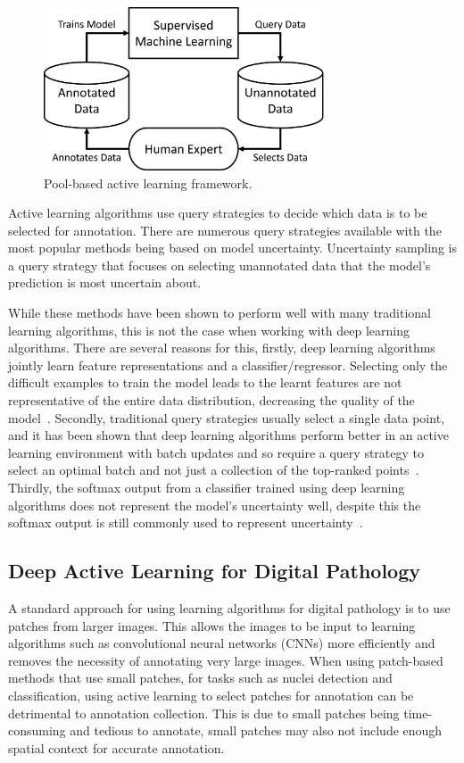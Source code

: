 \begin{figure}[h]
	\centering
	\includegraphics[width=0.75\textwidth]{images/active_learning.png}
	\caption{Pool-based active learning framework.}
	\label{fig:pool_based_active_learning}
\end{figure}

Active learning algorithms use query strategies to decide which data is to be selected for annotation. There are numerous query strategies available with the most popular methods being based on model uncertainty. Uncertainty sampling is a query strategy that focuses on selecting unannotated data that the model’s prediction is most uncertain about.

While these methods have been shown to perform well with many traditional learning algorithms, this is not the case when working with deep learning algorithms. There are several reasons for this, firstly, deep learning algorithms jointly learn feature representations and a classifier/regressor. Selecting only the difficult examples to train the model leads to the learnt features are not representative of the entire data distribution, decreasing the quality of the model~\citep{wang2016cost}. Secondly, traditional query strategies usually select a single data point, and it has been shown that deep learning algorithms perform better in an active learning environment with batch updates and so require a query strategy to select an optimal batch and not just a collection of the top-ranked points~\citep{sener2017active}. Thirdly, the softmax output from a classifier trained using deep learning algorithms does not represent the model’s uncertainty well, despite this the softmax output is still commonly used to represent uncertainty~\citep{gal2016dropout}.

\subsection{Deep Active Learning for Digital Pathology}
A standard approach for using learning algorithms for digital pathology is to use patches from larger images. This allows the images to be input to learning algorithms such as convolutional neural networks (CNNs) more efficiently and removes the necessity of annotating very large images. When using patch-based methods that use small patches, for tasks such as nuclei detection and classification, using active learning to select patches for annotation can be detrimental to annotation collection. This is due to small patches being time-consuming and tedious to annotate, small patches may also not include enough spatial context for accurate annotation.

